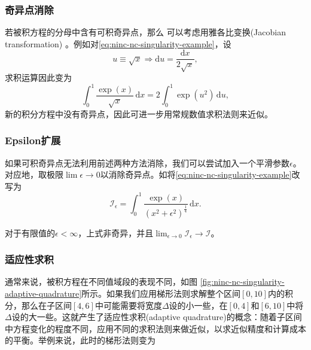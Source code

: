 \subsubsection{奇异点消除}
\label{sec:ninc-nc-singularity-cancellation}
若被积方程的分母中含有可积奇异点，那么
可以考虑用雅各比变换(Jacobian transformation)
。例如对\eqref{eq:ninc-nc-singularity-example}，设
\begin{equation*}
  u \equiv \sqrt{x} \Rightarrow \mathrm{d} u = \frac{\mathrm{d} x}{2 \sqrt{x}},
\end{equation*}
求积运算因此变为
\begin{equation*}
  \int_{0}^{1} \frac{\exp(x)}{\sqrt{x}} \, \mathrm{d} x= 2 \int_{0}^{1} \exp \left( u ^{2} \right) \, \mathrm{d} u,
\end{equation*}
新的积分方程中没有奇异点，因此可进一步用常规数值求积法则来近似。

\subsubsection{Epsilon扩展}
\label{sec:ninc-nc-singularity-epsilon-extension}
如果可积奇异点无法利用前述两种方法消除，我们可以尝试加入一个平滑参数$\epsilon$。对应地，取极限$\lim \epsilon \rightarrow 0$以消除奇异点。如将\eqref{eq:ninc-nc-singularity-example}改写为
\begin{equation*}
  \mathcal{I}_{\epsilon} = \int_{0}^{1}
  \frac{
  \exp (x)
  }{
  \left( x^{2} + \epsilon^{2} \right)^{\frac{1}{4}}
  } \, \mathrm{d} x.
\end{equation*}

对于有限值的$\epsilon < \infty$，上式非奇异，并且$\lim_{\epsilon \rightarrow 0} \mathcal{I}_{\epsilon} \rightarrow \mathcal{I}$。

\subsubsection{适应性求积}
\label{sec:ninc-nc-singularity-adaptive-quadrature}
通常来说，被积方程在不同值域段的表现不同，如图  \ref{fig:ninc-nc-singularity-adaptive-quadrature}所示。如果我们应用梯形法则求解整个区间$[0,10]$内的积分，那么在子区间$[4,6]$中可能需要将宽度$\Delta$设的小一些，在$[0,4]$和$[6,10]$中将$\Delta$设的大一些。这就产生了适应性求积(adaptive quadrature)的概念：随着子区间中方程变化的程度不同，应用不同的求积法则来做近似，以求近似精度和计算成本的平衡。举例来说，此时的梯形法则变为

